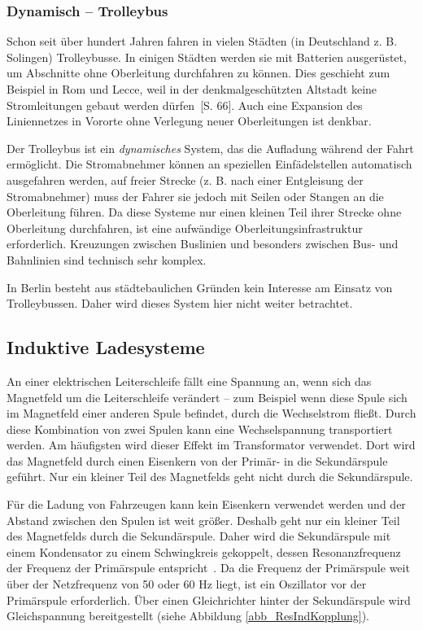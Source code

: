 \subsubsection{Dynamisch – Trolleybus} 
Schon seit über hundert Jahren fahren in vielen Städten (in Deutschland z. B. Solingen) Trolleybusse. In einigen Städten werden sie mit Batterien ausgerüstet, um Abschnitte ohne Oberleitung durchfahren zu können. Dies geschieht zum Beispiel in Rom und Lecce, weil in der denkmalgeschützten Altstadt keine Stromleitungen gebaut werden dürfen~\cite{tub_aleph001746639}[S. 66]. Auch eine Expansion des Liniennetzes in Vororte ohne Verlegung neuer Oberleitungen ist denkbar.

Der Trolleybus ist ein \emph{dynamisches} System, das die Aufladung während der Fahrt ermöglicht. Die Stromabnehmer können an speziellen Einfädelstellen automatisch ausgefahren werden, auf freier Strecke (z. B. nach einer Entgleisung der Stromabnehmer) muss der Fahrer sie jedoch mit Seilen oder Stangen an die Oberleitung führen. Da diese Systeme nur einen kleinen Teil ihrer Strecke ohne Oberleitung durchfahren, ist eine aufwändige Oberleitungsinfrastruktur erforderlich. Kreuzungen zwischen Buslinien und besonders zwischen Bus- und Bahnlinien sind technisch sehr komplex.

In Berlin besteht aus städtebaulichen Gründen kein Interesse am Einsatz von Trolleybussen. Daher wird dieses System hier nicht weiter betrachtet.
                                 
\subsection{Induktive Ladesysteme}
An einer elektrischen Leiterschleife fällt eine Spannung an, wenn sich das Magnetfeld um die Leiterschleife verändert – zum Beispiel wenn diese Spule sich im Magnetfeld einer anderen Spule befindet, durch die Wechselstrom fließt. Durch diese Kombination von zwei Spulen kann eine Wechselspannung transportiert werden. Am häufigsten wird dieser Effekt im Transformator verwendet. Dort wird das Magnetfeld durch einen Eisenkern von der Primär- in die Sekundärspule geführt. Nur ein kleiner Teil des Magnetfelds geht nicht durch die Sekundärspule.

Für die Ladung von Fahrzeugen kann kein Eisenkern verwendet werden und der Abstand zwischen den Spulen ist weit größer. Deshalb geht nur ein kleiner Teil des Magnetfelds durch die Sekundärspule. Daher wird die Sekundärspule mit einem Kondensator zu einem Schwingkreis gekoppelt, dessen Resonanzfrequenz der Frequenz der Primärspule entspricht~\cite{Kurs06072007}. Da die Frequenz der Primärspule weit über der Netzfrequenz von 50 oder 60 Hz liegt, ist ein Oszillator vor der Primärspule erforderlich. Über einen Gleichrichter hinter der Sekundärspule wird Gleichspannung bereitgestellt (siehe Abbildung \ref{abb_ResIndKopplung}).

